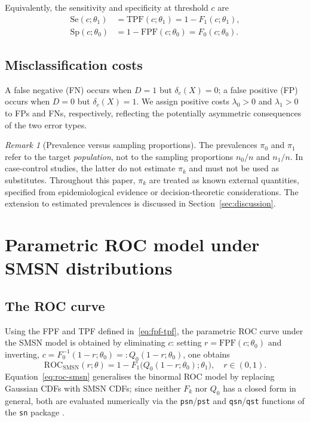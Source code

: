 \documentclass[11pt,a4paper]{article}
\theoremstyle{definition}
\theoremstyle{remark}
\newtheorem{remark}[theorem]{Remark}
\newcommand{\1}{\mathbf{1}}
\begin{document}
\noindent
Equivalently, the sensitivity and specificity at threshold $c$ are
\begin{equation}
\label{eq:se-sp}
\begin{split}
\mathrm{Se}(c;\theta_1) &= \mathrm{TPF}(c;\theta_1) = 1 - F_1(c;\theta_1), \\
\mathrm{Sp}(c;\theta_0) &= 1 - \mathrm{FPF}(c;\theta_0) = F_0(c;\theta_0).
\end{split}
\end{equation}

\subsection{Misclassification costs}
A false negative (FN) occurs when $D = 1$ but $\delta_c(X) = 0$;
a false positive (FP) occurs when $D = 0$ but $\delta_c(X) = 1$.
We assign positive costs $\lambda_0 > 0$ and $\lambda_1 > 0$
to FPs and FNs, respectively, reflecting the potentially
asymmetric consequences of the two error types.

\begin{remark}[Prevalence versus sampling proportions]
\label{rem:prevalence}
\normalfont
The prevalences $\pi_0$ and $\pi_1$ refer to the target
\emph{population}, not to the sampling proportions $n_0/n$
and $n_1/n$.
In case-control studies, the latter do not estimate $\pi_k$
and must not be used as substitutes.
Throughout this paper, $\pi_k$ are treated as known external
quantities, specified from epidemiological evidence or
decision-theoretic considerations. The extension to estimated
prevalences is discussed in Section~\ref{sec:discussion}.
\end{remark}


\section{Parametric ROC model under SMSN distributions}
\label{sec:roc}

\subsection{The ROC curve}

Using the FPF and TPF defined in~\eqref{eq:fpf-tpf}, the
parametric ROC curve under the SMSN model is obtained by
eliminating $c$: setting $r = \mathrm{FPF}(c;\theta_0)$
and inverting,
$c = F_0^{-1}(1-r;\theta_0) =: Q_0(1-r;\theta_0)$,
one obtains
\begin{equation}
\label{eq:roc-smsn}
\mathrm{ROC}_{\mathrm{SMSN}}(r;\theta)
= 1 - F_1\!\bigl(Q_0(1-r;\theta_0);\theta_1\bigr),
\quad r \in (0,1).
\end{equation}
Equation~\eqref{eq:roc-smsn} generalises the binormal ROC
model by replacing Gaussian CDFs with SMSN CDFs;
since neither $F_k$ nor $Q_0$ has a closed form in general,
both are evaluated numerically via the
\texttt{psn}/\texttt{pst} and \texttt{qsn}/\texttt{qst}
functions of the \texttt{sn} package \citep{azzalini2020package}.
\end{document}
